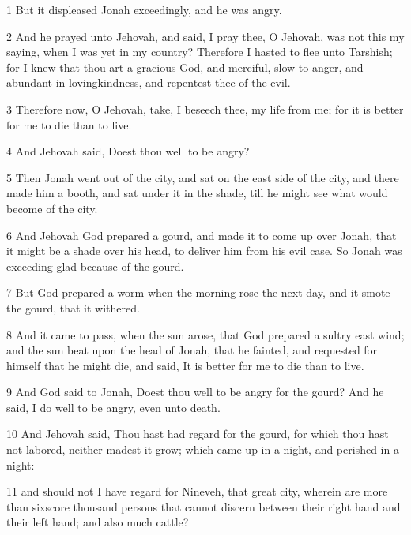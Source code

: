 \par 1 But it displeased Jonah exceedingly, and he was angry.
\par 2 And he prayed unto Jehovah, and said, I pray thee, O Jehovah, was not this my saying, when I was yet in my country? Therefore I hasted to flee unto Tarshish; for I knew that thou art a gracious God, and merciful, slow to anger, and abundant in lovingkindness, and repentest thee of the evil.
\par 3 Therefore now, O Jehovah, take, I beseech thee, my life from me; for it is better for me to die than to live.
\par 4 And Jehovah said, Doest thou well to be angry?
\par 5 Then Jonah went out of the city, and sat on the east side of the city, and there made him a booth, and sat under it in the shade, till he might see what would become of the city.
\par 6 And Jehovah God prepared a gourd, and made it to come up over Jonah, that it might be a shade over his head, to deliver him from his evil case. So Jonah was exceeding glad because of the gourd.
\par 7 But God prepared a worm when the morning rose the next day, and it smote the gourd, that it withered.
\par 8 And it came to pass, when the sun arose, that God prepared a sultry east wind; and the sun beat upon the head of Jonah, that he fainted, and requested for himself that he might die, and said, It is better for me to die than to live.
\par 9 And God said to Jonah, Doest thou well to be angry for the gourd? And he said, I do well to be angry, even unto death.
\par 10 And Jehovah said, Thou hast had regard for the gourd, for which thou hast not labored, neither madest it grow; which came up in a night, and perished in a night:
\par 11 and should not I have regard for Nineveh, that great city, wherein are more than sixscore thousand persons that cannot discern between their right hand and their left hand; and also much cattle?

